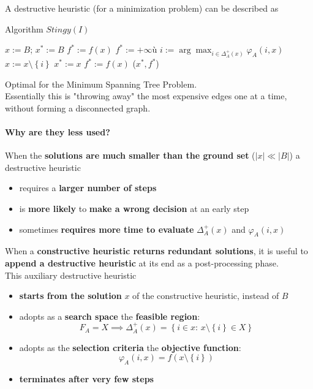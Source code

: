 \documentclass[11pt]{article}
\begin{document}
	
	A destructive heuristic (for a minimization problem) can be described as
	\begin{algorithm}
		\caption{Algorithm $Stingy(I)$}
		\begin{algorithmic}
			\STATE $x := B$; $x^\ast := B$
				\STATE $f^\ast := f (x)$ 
			\ELSE 
				\STATE $f^\ast := + \infty$ù
			\ENDIF
				\STATE $i := \arg \max_{i \in \Delta_A^+ (x)} \varphi_A (i,x)$
				\STATE $x := x \setminus \left\{i\right\}$
					\STATE $x^\ast := x$
					\STATE $f^\ast := f(x)$
				\ENDIF
			\ENDWHILE
			\RETURN ($x^\ast, f^\ast$)
		\end{algorithmic}
	\end{algorithm}
	Optimal for the Minimum Spanning Tree Problem.\\
	
	Essentially this is "throwing away" the most expensive edges one at a time, without forming a disconnected graph.\\
	
	\newpage
	
	\paragraph{Why are they less used?} When the \textbf{solutions are much smaller than the ground set} ($|x| \ll |B|$) a destructive heuristic
	\begin{itemize}
		\item requires a \textbf{larger number of steps}
		
		\item is \textbf{more likely} to \textbf{make a wrong decision} at an early step
		
		\item sometimes \textbf{requires more time to evaluate} $\Delta_A^+ (x)$ and $\varphi_A (i, x)$
	\end{itemize}
	
	When a \textbf{constructive heuristic returns redundant solutions}, it is useful to \textbf{append a destructive heuristic} at its end as a post-processing phase.\\
	
	This auxiliary destructive heuristic
	\begin{itemize}
		\item \textbf{starts from the solution} $x$ of the constructive heuristic, instead of $B$
		
		\item adopts as a \textbf{search space} the \textbf{feasible region}:
		$$ F_A = X \implies \Delta_A^+ (x) = \left\{ i \in x : \, x \setminus \left\{i\right\} \in X \right\} $$
		
		\item adopts as the \textbf{selection criteria} the \textbf{objective function}:
		$$ \varphi_A (i,x) = f (x \setminus \left\{i\right\}) $$
		
		\item \textbf{terminates after very few steps}
	\end{itemize}
	
\end{document}
